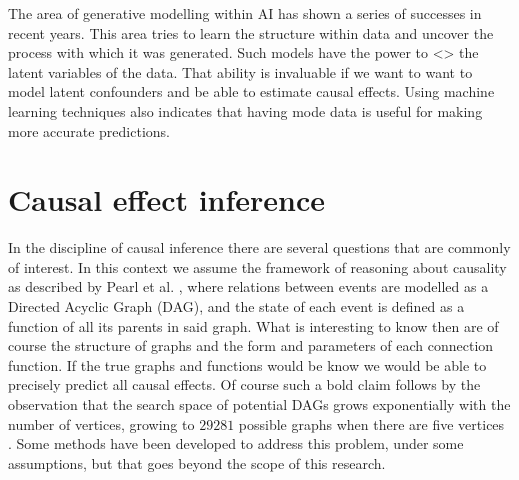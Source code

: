 \documentclass{report}
\newcommand{\bx}{\mathbf{x}}
\newcommand{\bZ}{\mathbf{Z}}
\begin{document}

The area of generative modelling within AI has shown a series of successes in recent years. This area tries to learn the structure within data and uncover the process with which it was generated. Such models have the power to <> the latent variables of the data. That ability is invaluable if we want to want to model latent confounders and be able to estimate causal effects. Using machine learning techniques also indicates that having mode data is useful for making more accurate predictions.





\chapter{Causal effect inference}
In the discipline of causal inference there are several questions that are commonly of interest. In this context we assume the framework of reasoning about causality as described by Pearl et al. \cite{pearl2009causal}, where relations between events are modelled as a Directed Acyclic Graph (DAG), and the state of each event is defined as a function of all its parents in said graph. What is interesting to know then are of course the structure of graphs and the form and parameters of each connection function. If the true graphs and functions would be know we would be able to precisely predict all causal effects. Of course such a bold claim follows by the observation that the search space of potential DAGs grows exponentially with the number of vertices, growing to $29281$ possible graphs when there are five vertices \cite{robinson1977counting}. Some methods have been developed to address this problem, under some assumptions, but that goes beyond the scope of this research.
\end{document}
